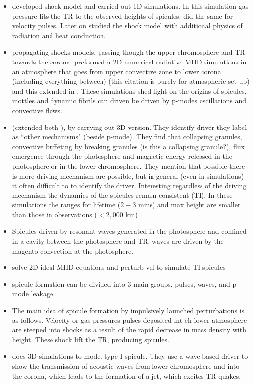 \begin{itemize}
         \item \cite{Hollweg1982ApJ257345H} developed shock model and carried out 1D simulations. In this simulation gas pressure lits the TR to the observed heights of spicules. \cite{Suematsu1982SoPh7599S} did the same for velocity pulses. Later on \cite{Heggland2007ApJ6661277H} studied the shock model with additional physics of radiation and heat conduction.
    \item  propagating shocks models, passing though the upper chromosphere and TR towards the corona. \cite{Hansteen2006ApJ} preformed a 2D numerical radiative MHD simulations in an atmosphere that goes from upper convective zone to lower corona (including everything between) \cite{Hansteen2007ASPC368107H} (this citation is purely for atmospheric set up) and this extended in \cite{De_Pontieu2007ApJ}. These simulations shed light on the origins of spicules, mottles and dynamic fibrils can driven be driven by p-modes oscillations and convective flows.
    \item \cite{Mart2009ApJ7011569M} (extended both \citep{De_Pontieu2007ApJ,Hansteen2006ApJ}), by carrying out 3D version. They identify driver they label as ``other mechanisms" (beside p-mode). They find that collapsing granules, convective buffeting by breaking granules (is this a collapsing granule?), flux emergence through the photosphere and magnetic energy released in the photosphere or in the lower chromosphere. They mention that possible there is more driving mechanism are possible, but in general (even in simulations) it often difficult to to identify the driver. Interesting regardless of the driving mechanism the dynamics of the spicules remain consistent (TI). In these simulations the ranges for lifetime ($2-3$ mins) and max height are smaller than those in observations ($<2,000$ km)  
    \item \cite{Matsumoto2010ApJ7101857M}  Spicules driven by resonant \Alfven waves generated in the photosphere and confined in a cavity between the photosphere and TR. \Alfven waves are driven by the magento-convection at the photosphere. 
    \item solve 2D ideal MHD equations and perturb vel to simulate TI spicules \cite{Murawski2010AA519A8M} 
    \item \cite{Murawski2010AA519A8M} spicule formation can be divided into 3 main groups, pulses, \Alfven waves, and p-mode leakage. 
    \item The main idea of spicule formation by impulsively launched perturbations is as follows. Velocity or gas pressures pulses deposited int eh lower atmosphere are steeped into shocks as a result of the rapid decrease in mass density with height. These shock lift the TR, producing spicules.

    \item \cite{Scullion2011ApJ74314S} does 3D simulations to model type I spicule. They use a wave based driver to show the transmission of acoustic waves from lower chromosphere and into the corona, which leads to the formation of a jet, which excites TR quakes.
\end{itemize}



